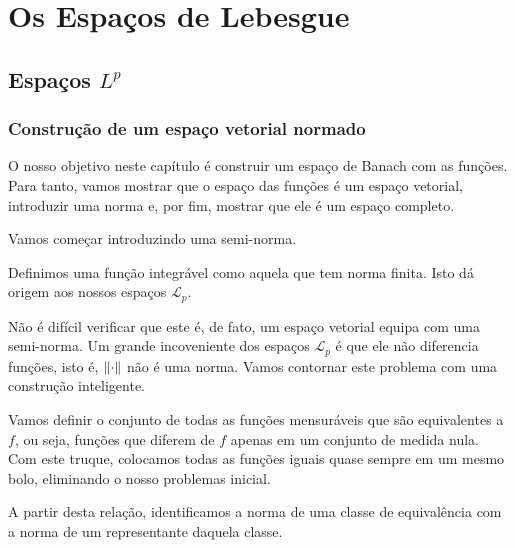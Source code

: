 \chapter{Os Espaços de Lebesgue}












\section{Espaços \texorpdfstring{$L^p$}{Lp}}

\subsection{Construção de um espaço vetorial normado}

O nosso objetivo neste capítulo é construir um espaço de Banach com as funções. Para tanto, vamos mostrar que o espaço das funções é um espaço vetorial, introduzir uma norma e, por fim, mostrar que ele é um espaço completo.

Vamos começar introduzindo uma semi-norma.

\functionSeminorm

Definimos uma função integrável como aquela que tem norma finita. Isto dá origem aos nossos espaços $\mathcal{L}_p$.

\spaceLpSeminorm

Não é difícil verificar que este é, de fato, um espaço vetorial equipa com uma semi-norma. Um grande incoveniente dos espaços $\mathcal{L}_p$ é que ele não diferencia funções, isto é, $\left\lVert \cdot \right\rVert$ não é uma norma. Vamos contornar este problema com uma construção inteligente.

\equivalenceRelationLp

Vamos definir o conjunto de todas as funções mensuráveis que são equivalentes a $f$, ou seja, funções que diferem de $f$ apenas em um conjunto de medida nula. Com este truque, colocamos todas as funções iguais quase sempre em um mesmo bolo, eliminando o nosso problemas inicial.

\equivalenceClassOfFunction

A partir desta relação, identificamos a norma de uma classe de equivalência com a norma de um representante daquela classe.

